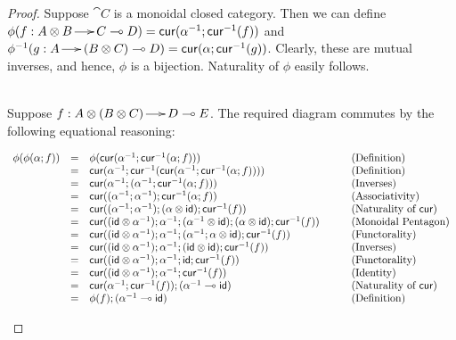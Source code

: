 \begin{proof}
  Suppose $\cat{C}$ is a monoidal closed category.  Then we can define
  $\phi(f : A \otimes B \to C \multimap D) = \mathsf{cur}(\alpha^{-1} ; \mathsf{cur}^{-1}(f))$
  and $\phi^{-1}(g : A \to (B \otimes C) \multimap D) = \mathsf{cur}(\alpha ;
    \mathsf{cur}^{-1}(g))$.  Clearly, these are mutual inverses, and hence, $\phi$
  is a bijection.  Naturality of $\phi$ easily follows.

  \ \\
  \noindent
  Suppose $f : A \otimes (B \otimes C) \to D \multimap E$.  The required
  diagram commutes by the following equational reasoning:
  \begin{center}
    \begin{math}
      \begin{array}{lllllllll}
        \phi(\phi(\alpha;f))
        & = & \phi(\mathsf{cur}(\alpha^{-1};\mathsf{cur}^{-1}(\alpha;f))) & \quad & \text{(Definition)}\\
        & = & \mathsf{cur}(\alpha^{-1};\mathsf{cur}^{-1}(\mathsf{cur}(\alpha^{-1};\mathsf{cur}^{-1}(\alpha;f)))) && \text{(Definition)}\\
        & = & \mathsf{cur}(\alpha^{-1};(\alpha^{-1};\mathsf{cur}^{-1}(\alpha;f))) && \text{(Inverses)}\\
        & = & \mathsf{cur}((\alpha^{-1};\alpha^{-1});\mathsf{cur}^{-1}(\alpha;f)) && \text{(Associativity)}\\
        & = & \mathsf{cur}((\alpha^{-1};\alpha^{-1});(\alpha \otimes \mathsf{id});\mathsf{cur}^{-1}(f)) && \text{(Naturality of } \mathsf{cur}\text{)}\\
        & = & \mathsf{cur}((\mathsf{id} \otimes \alpha^{-1});\alpha^{-1};(\alpha^{-1} \otimes \mathsf{id});(\alpha \otimes \mathsf{id});\mathsf{cur}^{-1}(f)) && \text{(Monoidal Pentagon)}\\
        & = & \mathsf{cur}((\mathsf{id} \otimes \alpha^{-1});\alpha^{-1};(\alpha^{-1};\alpha \otimes \mathsf{id});\mathsf{cur}^{-1}(f)) && \text{(Functorality)}\\
        & = & \mathsf{cur}((\mathsf{id} \otimes \alpha^{-1});\alpha^{-1};(\mathsf{id} \otimes \mathsf{id});\mathsf{cur}^{-1}(f)) && \text{(Inverses)}\\
        & = & \mathsf{cur}((\mathsf{id} \otimes \alpha^{-1});\alpha^{-1};\mathsf{id};\mathsf{cur}^{-1}(f)) && \text{(Functorality)}\\
        & = & \mathsf{cur}((\mathsf{id} \otimes \alpha^{-1});\alpha^{-1};\mathsf{cur}^{-1}(f)) && \text{(Identity)}\\
        & = & \mathsf{cur}(\alpha^{-1};\mathsf{cur}^{-1}(f));(\alpha^{-1} \multimap \mathsf{id}) && \text{(Naturality of } \mathsf{cur}\text{)}\\
        & = & \phi(f);(\alpha^{-1} \multimap \mathsf{id}) && \text{(Definition)}\\
      \end{array}
    \end{math}
  \end{center}
\end{proof}
